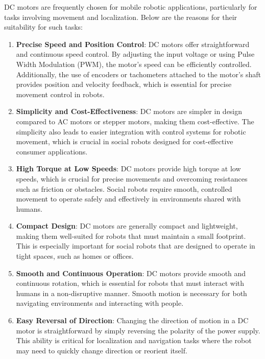 \documentclass{article}
\begin{document}
DC motors are frequently chosen for mobile robotic applications, particularly for tasks involving movement and localization. Below are the reasons for their suitability for such tasks:

\begin{enumerate}
    \item \textbf{Precise Speed and Position Control}: DC motors offer straightforward and continuous speed control. By adjusting the input voltage or using Pulse Width Modulation (PWM), the motor’s speed can be efficiently controlled. Additionally, the use of encoders or tachometers attached to the motor's shaft provides position and velocity feedback, which is essential for precise movement control in robots.
    
    \item \textbf{Simplicity and Cost-Effectiveness}: DC motors are simpler in design compared to AC motors or stepper motors, making them cost-effective. The simplicity also leads to easier integration with control systems for robotic movement, which is crucial in social robots designed for cost-effective consumer applications.
    
    \item \textbf{High Torque at Low Speeds}: DC motors provide high torque at low speeds, which is crucial for precise movements and overcoming resistances such as friction or obstacles. Social robots require smooth, controlled movement to operate safely and effectively in environments shared with humans.
    
    \item \textbf{Compact Design}: DC motors are generally compact and lightweight, making them well-suited for robots that must maintain a small footprint. This is especially important for social robots that are designed to operate in tight spaces, such as homes or offices.
    
    \item \textbf{Smooth and Continuous Operation}: DC motors provide smooth and continuous rotation, which is essential for robots that must interact with humans in a non-disruptive manner. Smooth motion is necessary for both navigating environments and interacting with people.
    
    \item \textbf{Easy Reversal of Direction}: Changing the direction of motion in a DC motor is straightforward by simply reversing the polarity of the power supply. This ability is critical for localization and navigation tasks where the robot may need to quickly change direction or reorient itself.
    

\end{enumerate}
\end{document}
